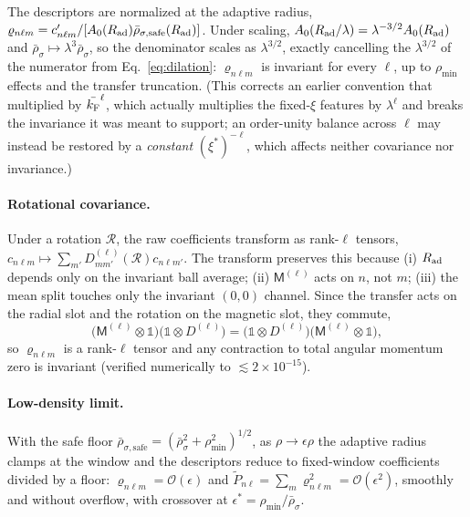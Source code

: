The descriptors are normalized at the adaptive radius,
$\varrho_{n\ell m}=c'_{n\ell m}/[A_0(R_{\mathrm{ad}})\bar\rho_{\sigma,\mathrm{safe}}(R_{\mathrm{ad}})]$. Under
scaling, $A_0(R_{\mathrm{ad}}/\lambda)=\lambda^{-3/2}A_0(R_{\mathrm{ad}})$ and
$\bar\rho_\sigma\mapsto\lambda^3\bar\rho_\sigma$, so the denominator scales as
$\lambda^{3/2}$, exactly cancelling the $\lambda^{3/2}$ of the numerator from
Eq.~\eqref{eq:dilation}: $\varrho_{n\ell m}$ is invariant for every $\ell$, up to
$\rho_{\min}$ effects and the transfer truncation. (This corrects an earlier
convention that multiplied by $\bar{k_{\mathrm{F}}}^\ell$, which actually multiplies the
fixed-$\xi$ features by $\lambda^\ell$ and breaks the invariance it was meant to
support; an order-unity balance across $\ell$ may instead be restored by a
\emph{constant} $(\xi^*)^{-\ell}$, which affects neither covariance nor
invariance.)

\paragraph*{Rotational covariance.}
Under a rotation $\mathcal R$, the raw coefficients transform as rank-$\ell$
tensors, $c_{n\ell m}\mapsto\sum_{m'}D^{(\ell)}_{mm'}(\mathcal R)c_{n\ell m'}$.
The transform preserves this because (i) $R_{\mathrm{ad}}$ depends only on the invariant ball
average; (ii) $\mathsf M^{(\ell)}$ acts on $n$, not $m$; (iii) the mean split
touches only the invariant $(0,0)$ channel. Since the transfer acts on the radial
slot and the rotation on the magnetic slot, they commute,
\begin{equation}
\label{eq:commute}
\bigl(\mathsf M^{(\ell)}\otimes\mathbb 1\bigr)\bigl(\mathbb 1\otimes D^{(\ell)}\bigr)
=\bigl(\mathbb 1\otimes D^{(\ell)}\bigr)\bigl(\mathsf M^{(\ell)}\otimes\mathbb 1\bigr),
\end{equation}
so $\varrho_{n\ell m}$ is a rank-$\ell$ tensor and any contraction to total angular
momentum zero is invariant (verified numerically to $\lesssim2\times10^{-15}$).

\paragraph*{Low-density limit.}
With the safe floor $\bar\rho_{\sigma,\mathrm{safe}}=(\bar\rho_\sigma^2+\rho_{\min}^2)^{1/2}$,
as $\rho\to\epsilon\rho$ the adaptive radius clamps at the window and the descriptors
reduce to fixed-window coefficients divided by a floor: $\varrho_{n\ell m}=\mathcal O(\epsilon)$
and $\tilde P_{n\ell}=\sum_m \varrho_{n\ell m}^2=\mathcal O(\epsilon^2)$, smoothly and
without overflow, with crossover at $\epsilon^*=\rho_{\min}/\bar\rho_\sigma$.


